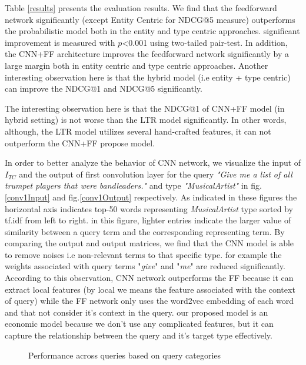 Table \ref{results} presents the evaluation results. We find that the feedforward network significantly (except Entity Centric for NDCG@5 measure) outperforms the probabilistic model both in the entity and type centric approaches. significant improvement is measured with $p$<0.001 using two-tailed pair-test. In addition, the CNN+FF architecture improves the feedforward network significantly by a large margin both in entity centric and type centric approaches. Another interesting observation here is that the hybrid model (i.e entity + type centric) can improve the NDCG@1 and NDCG@5 significantly.

The interesting observation here is that the NDCG@1 of CNN+FF model (in hybrid setting) is not worse than the LTR model significantly. In other words, although, the LTR model utilizes several hand-crafted features, it can not outperform the CNN+FF propose model.

In order to better analyze the behavior of CNN network, we visualize the input of $I_{TC}$ and the output of first convolution layer for the query \textit{"Give me a list of all trumpet players that were bandleaders."} and type \textit{"MusicalArtist"} in fig.\ref{conv1Input} and fig.\ref{conv1Output} respectively. As indicated in these figures the horizontal axis indicates top-50 words representing \textit{MusicalArtist} type sorted by tf.idf from left to right. in this figure, lighter entries indicate the larger value of similarity between a query term and the corresponding representing term. By comparing the output and output matrices, we find that the CNN model is able to remove noises i.e non-relevant terms to that specific type. for example the weights associated with query terms "\textit{give}" and "\textit{me}" are reduced significantly. According to this observation, CNN network outperforms the FF because it can extract local features (by local we means the feature associated with the context of query) while the FF network only uses the word2vec embedding of each word and that not consider it's context in the query. our proposed model is an economic model because we don't use any complicated features, but it can capture the relationship between the query and it's target type effectively.     





\begin{figure}
	
	\caption{Performance across queries based on query categories}

\end{figure}


